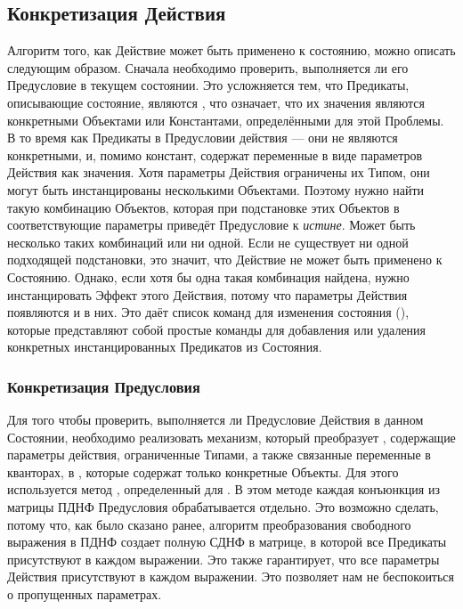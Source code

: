 \subsection{Конкретизация Действия}

Алгоритм того, как Действие может быть применено к состоянию, можно описать следующим образом.
Сначала необходимо проверить, выполняется ли его Предусловие в текущем состоянии.
Это усложняется тем, что Предикаты, описывающие состояние,
являются , что означает,
что их значения являются конкретными Объектами или Константами,
определёнными для этой Проблемы.
В то время как Предикаты в Предусловии действия 
--- они не являются конкретными, и, помимо констант, содержат переменные
в виде параметров Действия как значения.
Хотя параметры Действия ограничены их Типом, 
они могут быть инстанцированы несколькими Объектами.
Поэтому нужно найти такую комбинацию Объектов,
которая при подстановке этих Объектов в соответствующие параметры приведёт
Предусловие к \textit{истине}. Может быть несколько таких комбинаций или ни одной.
Если не существует ни одной подходящей подстановки,
это значит, что Действие не может быть применено к Состоянию.
Однако, если хотя бы одна такая комбинация найдена, нужно инстанцировать Эффект этого Действия,
потому что параметры Действия появляются и в них.
Это даёт список команд для изменения состояния (),
которые представляют собой простые команды для добавления или удаления
конкретных инстанцированных Предикатов из Состояния.

\subsubsection{Конкретизация Предусловия}

Для того чтобы проверить, выполняется ли Предусловие Действия в данном Состоянии,
необходимо реализовать механизм, который преобразует ,
содержащие параметры действия, ограниченные Типами,
а также связанные переменные в кванторах, в ,
которые содержат только конкретные Объекты.
Для этого используется метод , определенный для .
В этом методе каждая конъюнкция из матрицы ПДНФ Предусловия обрабатывается отдельно.
Это возможно сделать, потому что, как было сказано ранее,
алгоритм преобразования свободного выражения в ПДНФ создает полную СДНФ в матрице,
в которой все Предикаты присутствуют в каждом выражении.
Это также гарантирует, что все параметры Действия присутствуют в каждом выражении.
Это позволяет нам не беспокоиться о пропущенных параметрах.


